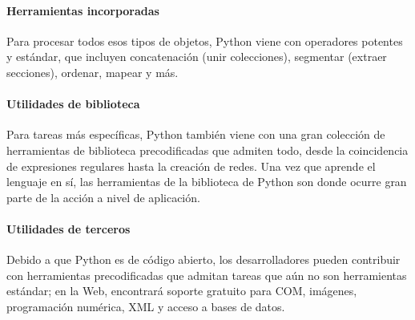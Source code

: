 \paragraph*{Herramientas incorporadas}
Para procesar todos esos tipos de objetos, Python viene con operadores potentes y estándar, que incluyen concatenación (unir colecciones), segmentar (extraer secciones), ordenar, mapear y más.
\paragraph*{Utilidades de biblioteca}
Para tareas más específicas, Python también viene con una gran colección de herramientas de biblioteca precodificadas que admiten todo, desde la coincidencia de expresiones regulares hasta la creación de redes. Una vez que aprende el lenguaje en sí, las herramientas de la biblioteca de Python son donde ocurre gran parte de la acción a nivel de aplicación.
\paragraph*{Utilidades de terceros}
Debido a que Python es de código abierto, los desarrolladores pueden contribuir con herramientas precodificadas que admitan tareas que aún no son herramientas estándar; en la Web, encontrará soporte gratuito para COM, imágenes, programación numérica, XML y acceso a bases de datos.